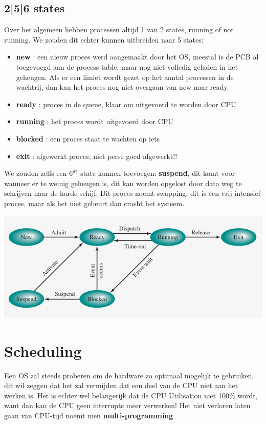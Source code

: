 \documentclass{report}
\begin{document}
   			\subsection{2|5|6 states}
   				Over het algemeen hebben processen altijd 1 van 2 states, running of not running. We zouden dit echter kunnen uitbreiden naar 5 states: 
   				\begin{itemize}
   					\item \textbf{new} : een nieuw proces werd aangemaakt door het OS, meestal is de PCB al toegevoegd aan de process table, maar nog niet volledig geladen in het geheugen. Als er een limiet wordt gezet op het aantal processen in de wachtrij, dan kan het proces nog niet overgaan van new naar ready.
   					\item \textbf{ready} : proces in de queue, klaar om uitgevoerd te worden door CPU
   					\item \textbf{running} : het proces wordt uitgevoerd door CPU
   					\item \textbf{blocked} : een proces staat te wachten op iets 
   					\item \textbf{exit} : afgewerkt proces, niet perse goed afgewerkt!!
   				\end{itemize}
   				We zouden zelfs een \(6^{de}\) state kunnen toevoegen: \textbf{suspend}, dit komt voor wanneer er te weinig geheugen is, dit kan worden opgelost door data weg te schrijven naar de harde schijf. Dit proces noemt swapping, dit is een vrij intensief proces, maar als het niet gebeurt dan crasht het systeem. 
   				\begin{center}
   					\includegraphics[scale=0.6]{six_states}
   				\end{center}
   		\section{Scheduling}
   			Een OS zal steeds proberen om de hardware zo optimaal mogelijk te gebruiken, dit wil zeggen dat het zal vermijden dat een deel van de CPU niet aan het werken is. Het is echter wel belangerijk dat de CPU Utilisation niet 100\% wordt, want dan kan de CPU geen interrupts meer verwerken! Het niet verloren laten gaan van CPU-tijd noemt men \textbf{multi-programming}	
\end{document}
